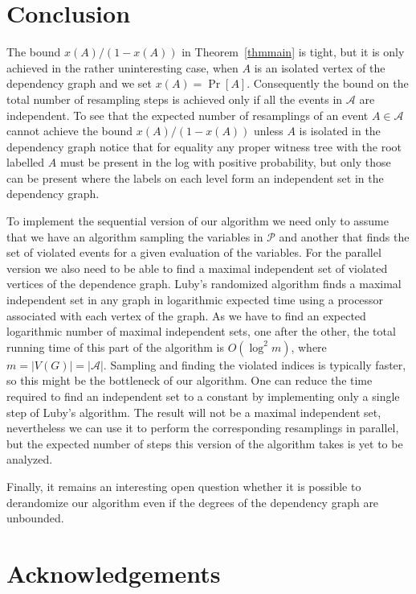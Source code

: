 \documentclass[11pt,a4paper]{article}
\DeclareMathOperator*{\pr}{Pr}
\begin{document}
\section{Conclusion}

The bound $x(A)/(1-x(A))$ in Theorem~\ref{thmmain} is tight, but it is only
achieved in the rather uninteresting case, when $A$ is an isolated vertex of
the dependency graph and we set $x(A)=\pr[A]$.
Consequently the bound on the total number of
resampling steps is achieved only if all the events in $\mathcal A$ are
independent. To see that the expected number of resamplings of an event
$A \in \mathcal A$ cannot achieve the bound $x(A)/(1-x(A))$ unless $A$ is isolated
in the dependency graph notice that for equality any proper witness tree with
the root labelled $A$ must be present in the log with positive probability,
but only those can be present where the labels on each level form an
independent set in the dependency graph.

To implement the sequential version of our algorithm we need only to assume
that we have an algorithm sampling the variables in $\mathcal{P}$
and another that finds the set of violated events for a given evaluation
of the variables. For the parallel version we also need to be able to find a
maximal independent set of violated vertices of the dependence graph. Luby's
randomized algorithm
finds a maximal independent set in any graph in logarithmic expected time
using a processor associated with each vertex of the graph. As we have to find
an expected logarithmic number of maximal independent sets, one after the
other, the total running time of this part of the algorithm is
$O(\log^2 m)$, where $m=|V(G)|=|\mathcal A|$. Sampling and finding the
violated indices is typically faster, so this might be the bottleneck of our
algorithm. One can reduce the time required to find an independent set to a
constant by implementing only a single step of Luby's algorithm. The result
will not be a maximal independent set, nevertheless we can use it to perform
the corresponding resamplings in parallel, but the expected number of steps
this version of the algorithm takes is yet to be analyzed.

Finally, it remains an interesting open question whether it is possible to
derandomize our algorithm even if the degrees of the dependency graph are
unbounded.

\section*{Acknowledgements}
\end{document}
